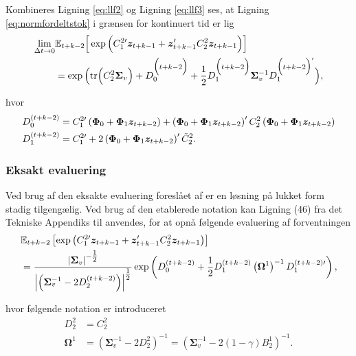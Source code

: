 \documentclass[
  a4paper,
  oneside]{memoir}
\begin{document}
Kombineres Ligning \eqref{eq:llf2} og Ligning \eqref{eq:llf3} ses, at Ligning \eqref{eq:normfordeltstok} i grænsen for kontinuert tid er lig
\begin{align}
\lim_{\Delta t \to 0} &\mathbb{E}_{t+k-2}\Big[ \exp\Big( C_1^{2\prime} \bm{z}_{t+k-1} + \bm{z}_{t+k-1}' C_2^2 \bm{z}_{t+k-1} \Big)\Big]\notag\\
                      &=\exp\Big( \text{tr}\Big(C_2^2\bm{\Sigma}_v\Big) + D_0^{\Big(t+k-2\Big)} + \frac{1}{2} D_1^{\Big(t+k-2\Big)} \bm{\Sigma}_v^{-1} D_1^{\Big(t+k-2\Big)'} \Big),\label{eq:komapproks}
\end{align}

hvor
\begin{align*}
D_0^{\left(t+k-2\right)}&=C_1^{2\prime} \left(\bm{\Phi}_0+\bm{\Phi}_1\bm{z}_{t+k-2} \right) + \left(\bm{\Phi}_0+\bm{\Phi}_1\bm{z}_{t+k-2} \right)' C_2^2 \left(\bm{\Phi}_0+\bm{\Phi}_1\bm{z}_{t+k-2}\right) \\
D_1^{\left(t+k-2\right)}&=C_1^{2\prime} + 2\left(\bm{\Phi}_0+\bm{\Phi}_1\bm{z}_{t+k-2}\right)' \Tilde{C}_2^{2}.
\end{align*}

\hypertarget{eksakt-evaluering}{%
\subsubsection{Eksakt evaluering}\label{eksakt-evaluering}}

Ved brug af den eksakte evaluering foreslået af \citep{CampVicCha2003} er en løsning på lukket form stadig tilgengælig. Ved brug af den etablerede notation kan Ligning (46) fra det Tekniske Appendiks til \citep{CampVicCha2003} anvendes, for at opnå følgende evaluering af forventningen
\begin{align}
&\mathbb{E}_{t+k-2}\left[ \exp\left( C_1^{2\prime} \bm{z}_{t+k-1} + \bm{z}_{t+k-1}' C_2^2 \bm{z}_{t+k-1} \right) \right]\notag\\
&= \frac{\left| \bm{\Sigma}_v \right|^{-\tfrac{1}{2}}}{\left| \left(\bm{\Sigma}_v^{-1} - 2 D_2^{\left(t+k-2\right)}\right) \right|^{\tfrac{1}{2}}}\exp\left(D_0^{\left(t+k-2\right)} + \frac{1}{2} D_1^{\left(t+k-2\right)} \left(\bm{\Omega}^1\right)^{-1} D_1^{\left(t+k-2\right)\prime}\right), \label{eq:llf5}
\end{align}

hvor følgende notation er introduceret
\begin{align*}
D_2^2&=C_2^2\\
\bm{\Omega}^1&=\left(\bm{\Sigma}_v^{-1} - 2D_2^2\right)^{-1}=\left(\bm{\Sigma}_v^{-1}  - 2\left(1-\gamma\right) B_2^1\right)^{-1}.
\end{align*}
\end{document}
